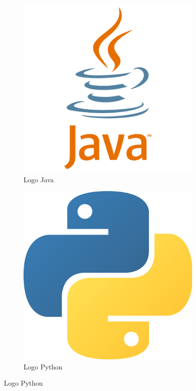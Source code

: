 \documentclass[12pt]{article}
\begin{document}
\begin{figure}[H]
\begin{subfigure}[b]{0.32\textwidth}
                \includegraphics[width=\textwidth]{img/6_java.png}
                \caption{Logo Java}
            \end{subfigure}
            \hfill
            \begin{subfigure}[b]{0.32\textwidth}
                \centering
                \includegraphics[width=\textwidth]{img/7_python.png}
                \caption{Logo Python}
            \end{subfigure}
        \end{figure}
\end{document}
